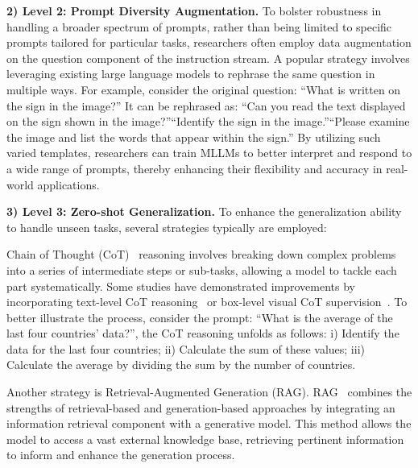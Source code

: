 \noindent \textbf{2) Level 2: Prompt Diversity Augmentation.} To bolster robustness in handling a broader spectrum of prompts, rather than being limited to specific prompts tailored for particular tasks, researchers often employ data augmentation on the question component of the instruction stream. A popular strategy involves leveraging existing large language models to rephrase the same question in multiple ways. For example, consider the original question: ``What is written on the sign in the image?'' It can be rephrased as: ``Can you read the text displayed on the sign shown in the image?''``Identify the sign in the image.''``Please examine the image and list the words that appear within the sign.''
By utilizing such varied templates, researchers can train MLLMs to better interpret and respond to a wide range of prompts, thereby enhancing their flexibility and accuracy in real-world applications.

\noindent \textbf{3) Level 3: Zero-shot Generalization.} To enhance the generalization ability to handle unseen tasks, several strategies typically are employed:

Chain of Thought (CoT)~\cite{wei2022chain} reasoning involves breaking down complex problems into a series of intermediate steps or sub-tasks, allowing a model to tackle each part systematically. Some studies have demonstrated improvements by incorporating text-level CoT reasoning~\cite{zhang2024cfret} or box-level visual CoT supervision~\cite{shao2025visual}. To better illustrate the process, consider the prompt: ``What is the average of the last four countries' data?'', the CoT reasoning unfolds as follows: i) Identify the data for the last four countries;
ii) Calculate the sum of these values;
iii) Calculate the average by dividing the sum by the number of countries.

Another strategy is Retrieval-Augmented Generation (RAG). RAG~\cite{arslan2024survey} combines the strengths of retrieval-based and generation-based approaches by integrating an information retrieval component with a generative model. This method allows the model to access a vast external knowledge base, retrieving pertinent information to inform and enhance the generation process. 

